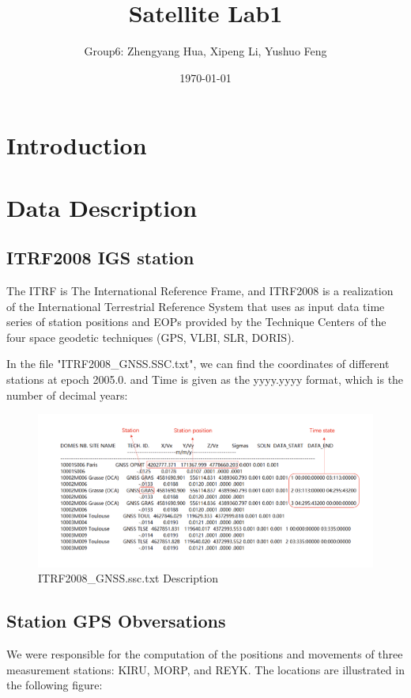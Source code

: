 \documentclass{article}
\title{Satellite Lab1}
\author{Group6: Zhengyang Hua, Xipeng Li, Yushuo Feng}
\date{\today}
\begin{document}
\maketitle

\section{Introduction}


\section{Data Description}
\subsection{ITRF2008 IGS station}
The ITRF is The International Reference Frame,  
and ITRF2008 is a realization of the International Terrestrial Reference System 
that uses as input data time series of station positions and EOPs provided by the Technique Centers of the four space geodetic techniques (GPS, VLBI, SLR, DORIS).

In the file "ITRF2008\_GNSS.SSC.txt", we can find the coordinates of different stations at epoch 2005.0.
 and Time is given as the yyyy.yyyy format, which is the number of decimal years:
\begin{figure}[htbp]
    \centering
    \includegraphics[width=12cm]{./source/ITRF2008.png}
    \caption{ITRF2008\_GNSS.ssc.txt Description}
    \label{fig:ITRF2008}
\end{figure}
\subsection{Station GPS Obversations}
We were responsible for the computation of the positions and movements of three measurement stations: KIRU, MORP, and REYK. The locations are illustrated in the following figure:
\end{document}
